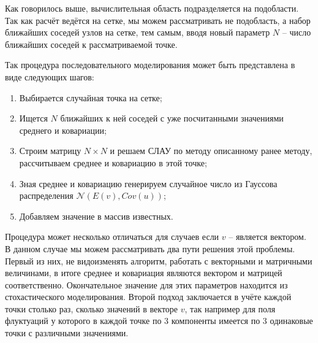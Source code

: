 Как говорилось выше, вычислительная область подразделяется на подобласти. Так как расчёт ведётся на сетке, мы можем рассматривать не подобласть, а набор ближайших соседей узлов на сетке, тем самым, вводя новый параметр $N$ -- число ближайших соседей к рассматриваемой точке.

Так процедура последовательного моделирования может быть представлена в виде следующих шагов: 

\begin{enumerate}
    \item Выбирается случайная точка на сетке;
    \item Ищется $N$ ближайших к ней соседей с уже посчитанными значениями среднего и ковариации;
    \item Строим матрицу $N \times N$ и решаем СЛАУ по методу описанному ранее методу, рассчитываем среднее и ковариацию в этой точке;
    \item Зная среднее и ковариацию генерируем случайное число из Гауссова распределения $\mathcal{N}(E(v), Cov(u))$;
    \item Добавляем значение в массив известных.
\end{enumerate}

Процедура может несколько отличаться для случаев если $v$ -- является вектором. В данном случае мы можем рассматривать два пути решения этой проблемы. Первый из них, не видоизменять алгоритм, работать с векторными и матричными величинами, в итоге среднее и ковариация являются вектором и матрицей соответственно. Окончательное значение для этих параметров находится из стохастического моделирования. Второй подход заключается в учёте каждой точки столько раз, сколько значений в векторе $v$, так например для поля флуктуаций у которого в каждой точке по 3 компоненты имеется по 3 одинаковые точки с различными значениями.
